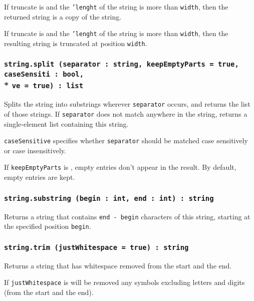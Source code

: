 If truncate is \false{} and the \texttt{'lenght} of the string is more than \texttt{width}, then the returned string is a copy of the string.

If truncate is \true{} and the \texttt{'lenght} of the string is more than \texttt{width}, then the resulting string is truncated at position \texttt{width}.

\subsubsection{\texttt{string.split (separator : string, keepEmptyParts = true, caseSensiti : bool,}\\* \texttt{ve = true) : list}}

Splits the string into substrings wherever \texttt{separator} occurs, and returns the list of those strings. If \texttt{separator} does not match anywhere in the string, returns a single-element list containing this string.

\texttt{caseSensitive} specifies whether \texttt{separator} should be matched case sensitively or case insensitively.

If \texttt{keepEmptyParts} is \false, empty entries don't appear in the result. By default, empty entries are kept.

\subsubsection{\texttt{string.substring (begin : int, end : int) : string}}

Returns a string that contains \texttt{end - begin} characters of this string, starting at the specified position \texttt{begin}.

\subsubsection{\texttt{string.trim (justWhitespace = true) : string}}

Returns a string that has whitespace removed from the start and the end.

If \texttt{justWhitespace} is \false{} will be removed any symbols excluding letters and digits (from the start and the end).

